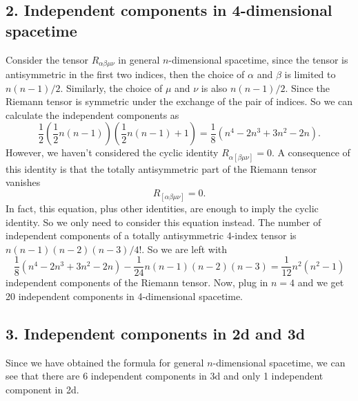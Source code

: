 \documentclass{article}
\begin{document}
\subsection*{2. Independent components in 4-dimensional spacetime}
Consider the tensor $R_{\alpha \beta \mu \nu}$ in general $n$-dimensional spacetime, since the tensor is antisymmetric in the first two indices, then the choice of $\alpha$ and $\beta$ is limited to $n(n-1)/2$. Similarly, the choice of $\mu$ and $\nu$ is also $n(n-1)/2$. Since the Riemann tensor is symmetric under the exchange of the pair of indices. So we can calculate the independent components as
\begin{equation}
\frac{1}{2}\left(\frac{1}{2}n(n-1)\right)\left(\frac{1}{2}n(n-1)+1\right)
=\frac{1}{8}(n^4-2n^3 +3n^2-2n).
\end{equation}
However, we haven't considered the cyclic identity $R_{\alpha [\beta \mu \nu]}=0$. A consequence of this identity is that the totally antisymmetric part of the Riemann tensor vanishes 
\begin{equation}
R_{[\alpha \beta  \mu \nu]}=0.
\end{equation}
In fact, this equation, plus other identities, are enough to imply the cyclic identity. So we only need to consider this equation instead. The number of independent components of a totally antisymmetric 4-index tensor is $n(n-1)(n-2)(n-3)/4!$. So we are left with 
\begin{equation}
\frac{1}{8}(n^4-2n^3 +3n^2-2n) - \frac{1}{24}n(n-1)(n-2)(n-3)=\frac{1}{12}n^2(n^2-1)
\end{equation}
independent components of the Riemann tensor.
Now, plug in $n=4$ and we get 20 independent components in 4-dimensional spacetime.

\subsection*{3. Independent components in 2d and 3d}
Since we have obtained the formula for general $n$-dimensional spacetime, we can see that there are 6 independent components in 3d and only 1 independent component in 2d.
\end{document}
